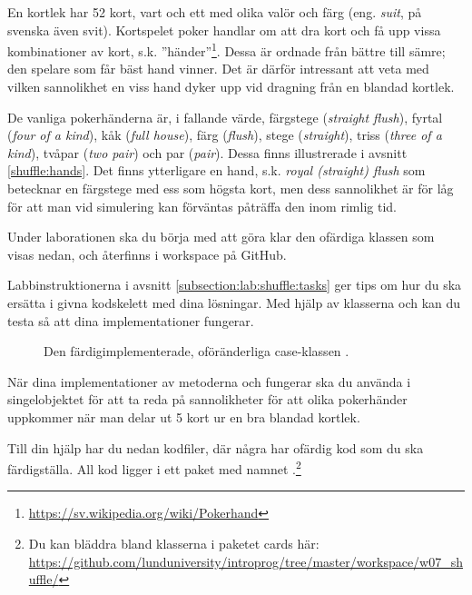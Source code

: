 En kortlek  har 52 kort, vart och ett med olika valör  och färg (eng. \emph{suit}, på svenska även svit). Kortspelet poker handlar om att dra kort och få upp vissa kombinationer av kort, s.k. ''händer''\footnote{\href{https://sv.wikipedia.org/wiki/Pokerhand}{https://sv.wikipedia.org/wiki/Pokerhand}}. Dessa är ordnade från bättre till sämre; den spelare som får bäst hand vinner.
Det är därför intressant att veta med vilken sannolikhet en viss hand dyker upp vid dragning från en blandad kortlek.

De vanliga pokerhänderna är, i fallande värde, färgstege (\emph{straight flush}), fyrtal (\emph{four of a kind}), kåk (\emph{full house}), färg (\emph{flush}), stege (\emph{straight}), triss (\emph{three of a kind}), tvåpar (\emph{two pair}) och par (\emph{pair}). Dessa finns illustrerade i avsnitt \ref{shuffle:hands}.
Det finns ytterligare en hand, s.k. \emph{royal (straight) flush} som betecknar en färgstege med ess som högsta kort, men dess sannolikhet är för låg för att man vid simulering kan förväntas påträffa den inom rimlig tid.

Under laborationen ska du börja med att göra klar den ofärdiga klassen  som visas nedan, och återfinns i workspace på GitHub.



Labbinstruktionerna i avsnitt \ref{subsection:lab:shuffle:tasks} ger tips om hur du ska ersätta  i givna kodskelett med dina lösningar.
Med hjälp av klasserna  och  kan du testa så att dina implementationer fungerar.

\begin{figure}
\caption{Den färdigimplementerade, oföränderliga case-klassen .}
\label{shuffle:fig-card}
\end{figure}




När dina implementationer av metoderna  och  fungerar ska du använda  i singelobjektet  för att ta reda på sannolikheter för att olika pokerhänder uppkommer när man delar ut 5 kort ur en bra blandad kortlek.

Till din hjälp har du nedan kodfiler, där några har ofärdig kod som du ska färdigställa. All kod  ligger i ett paket med namnet .\footnote{Du kan bläddra bland klasserna i paketet cards här: \\
\href{https://github.com/lunduniversity/introprog/tree/master/workspace/w07_shuffle/}{\mbox{\fontsize{9}{11}\selectfont  https://github.com/lunduniversity/introprog/tree/master/workspace/w07\_shuffle/}}}

